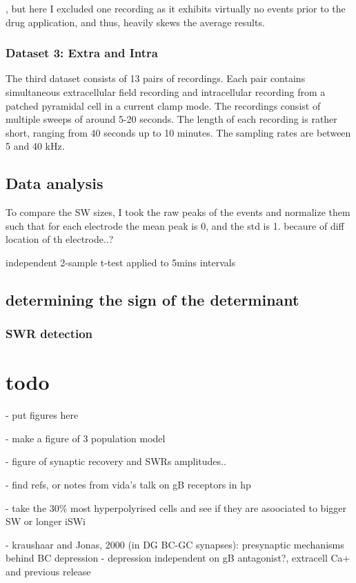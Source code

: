     , but here I excluded one recording as it exhibits virtually
    no events prior to the drug application, and thus, heavily skews the average
    results.

    \subsubsection{Dataset 3: Extra and Intra}
      The third dataset consists of 13 pairs of recordings.  Each pair contains
      simultaneous extracellular field recording and intracellular recording
      from a patched pyramidal cell in a current clamp mode.  The recordings
      consist of multiple sweeps of around 5-20 seconds.  The length of each
      recording is rather short, ranging from 40 seconds up to 10 minutes.  The
      sampling rates are between 5 and 40 kHz.

  \subsection{Data analysis}
      To compare the SW sizes, I took the raw peaks of
      the events and normalize them such that for each electrode the mean peak
      is 0, and the std is 1.  becaure of diff location of th electrode..?
      
      independent 2-sample t-test applied to 5mins intervals
      
  \subsection{determining the sign of the determinant}
    \subsubsection{SWR detection}
    
\section{todo}
  - put figures here

  - make a figure of 3 population model

  - figure of synaptic recovery and SWRs amplitudes..

  - find refs, or notes from vida's talk on gB receptors in hp

  - take the 30\% most hyperpolyrised cells and see if they are asoociated to bigger SW or longer iSWi

  - kraushaar and Jonas, 2000 (in DG BC-GC synapses): presynaptic mechanisms behind BC depression 
    - depression independent on gB antagonist?, extracell Ca+ and previous release

